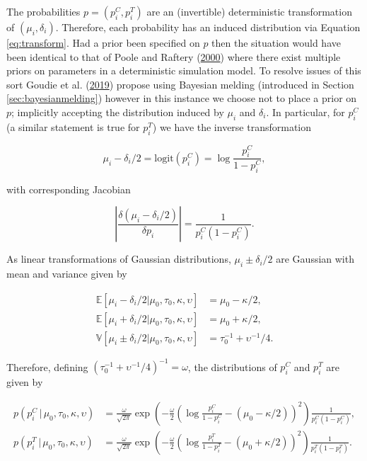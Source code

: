 \documentclass[11pt,]{book}
\begin{document}
The probabilities \(p = (p_i^C, p_i^T)\) are an (invertible)
deterministic transformation of \((\mu_i, \delta_i)\). Therefore, each
probability has an induced distribution via Equation
\eqref{eq:transform}. Had a prior been specified on \(p\) then the
situation would have been identical to that of Poole and Raftery
(\protect\hyperlink{ref-poole2000inference}{2000}) where there exist
multiple priors on parameters in a deterministic simulation model. To
resolve issues of this sort Goudie et al.
(\protect\hyperlink{ref-goudie2019joining}{2019}) propose using Bayesian
melding (introduced in Section \ref{sec:bayesianmelding}) however in
this instance we choose not to place a prior on \(p\); implicitly
accepting the distribution induced by \(\mu_i\) and \(\delta_i\). In
particular, for \(p_i^C\) (a similar statement is true for \(p_i^T\)) we
have the inverse transformation

\begin{equation}
\mu_i - \delta_i/2 = \text{logit}(p_i^C) = \log \frac{p_i^C}{1 - p_i^C},
\end{equation}

with corresponding Jacobian

\begin{equation}
\left|\frac{\delta (\mu_i - \delta_i/2)}{\delta p_i}\right| = \frac{1}{p_i^C(1-p_i^C)}.
\end{equation}

As linear transformations of Gaussian distributions,
\(\mu_i \pm \delta_i/2\) are Gaussian with mean and variance given by

\begin{align}
\mathbb{E}[\mu_i - \delta_i/2 | \mu_0, \tau_0, \kappa, \upsilon] &= \mu_0 - \kappa/2, \\
\mathbb{E}[\mu_i + \delta_i/2 | \mu_0, \tau_0, \kappa, \upsilon] &= \mu_0 + \kappa/2, \\
\mathbb{V}[\mu_i \pm \delta_i/2 | \mu_0, \tau_0, \kappa, \upsilon] &= \tau_0^{-1} + \upsilon^{-1}/4.
\end{align}

Therefore, defining \((\tau_0^{-1} + \upsilon^{-1}/4)^{-1} = \omega\),
the distributions of \(p_i^C\) and \(p_i^T\) are given by

\begin{align}
p(p_i^C \, | \, \mu_0, \tau_0, \kappa, \upsilon) &= \frac{\omega}{\sqrt{2\pi}} \exp\left(-\frac{\omega}{2}\left(\log \frac{p_i^C}{1 - p_i^C} - (\mu_0 - \kappa/2)\right)^2\right) \frac{1}{p_i^C(1-p_i^C)}, \label{eq:piC} \\
p(p_i^T \, | \, \mu_0, \tau_0, \kappa, \upsilon) &= \frac{\omega}{\sqrt{2\pi}} \exp\left(-\frac{\omega}{2}\left(\log \frac{p_i^T}{1 - p_i^T} - (\mu_0 + \kappa/2)\right)^2\right) \frac{1}{p_i^T(1-p_i^T)}. \label{eq:piT}
\end{align}
\end{document}
